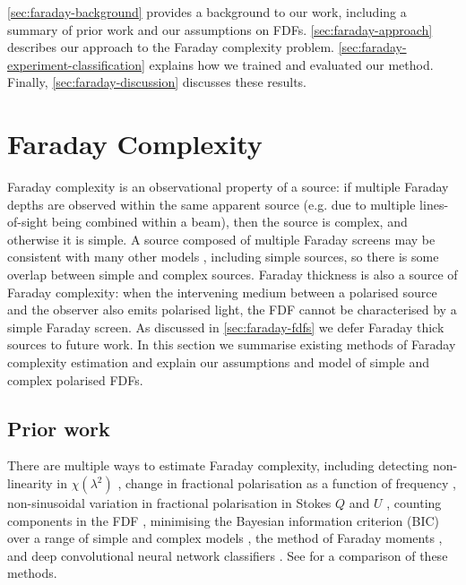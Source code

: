 
  \autoref{sec:faraday-background} provides a background to our work, including a summary of prior work and our assumptions on FDFs. \autoref{sec:faraday-approach} describes our approach to the Faraday complexity problem. \autoref{sec:faraday-experiment-classification} explains how we trained and evaluated our method. Finally, \autoref{sec:faraday-discussion} discusses these results.

\section{Faraday Complexity}
\label{sec:faraday-background}

    Faraday complexity is an observational property of a source: if multiple Faraday depths are observed within the same apparent source (e.g. due to multiple lines-of-sight being combined within a beam), then the source is complex, and otherwise it is simple. A source composed of multiple Faraday screens may be consistent with many other models \citep{sun15comparison}, including simple sources, so there is some overlap between simple and complex sources. Faraday thickness is also a source of Faraday complexity: when the intervening medium between a polarised source and the observer also emits polarised light, the FDF cannot be characterised by a simple Faraday screen. As discussed in \autoref{sec:faraday-fdfs} we defer Faraday thick sources to future work. In this section we summarise existing methods of Faraday complexity estimation and explain our assumptions and model of simple and complex polarised FDFs.

  \subsection{Prior work}
  \label{sec:faraday-prior-work}

      There are multiple ways to estimate Faraday complexity, including detecting non-linearity in $\chi(\lambda^2)$ \citep{goldstein84faraday}, change in fractional polarisation as a function of frequency \citep{farnes14broadband}, non-sinusoidal variation in fractional polarisation in Stokes $Q$ and $U$ \citep{osullivan12agn}, counting components in the FDF \citep{law11faraday}, minimising the Bayesian information criterion (BIC) over a range of simple and complex models \citep[called `QU fitting';][]{osullivan_broad-band_2017}, the method of Faraday moments \citep{anderson_broadband_2015,Brown11report}, and deep convolutional neural network classifiers \citep[CNNs;][]{brown_classifying_2018}. See \citet{sun15comparison} for a comparison of these methods.

